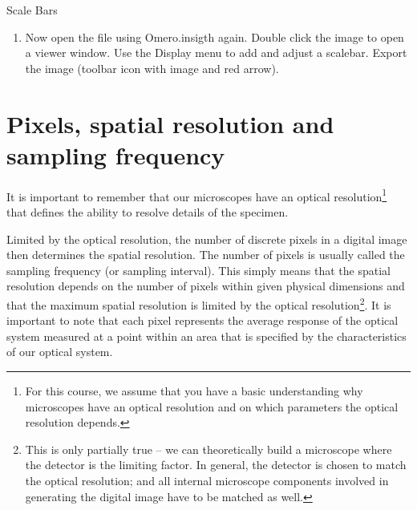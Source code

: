 \begin{taskbox}{Scale Bars}
\begin{enumerate}
        
	\begin{minipage}[t]{\linewidth}
		\begin{center}
		\medskip
		\label{fig:scale-bar-dialog}
		\end{center}
	\end{minipage}
	\item Now open the file using Omero.insigth again. Double
          click the image to open a viewer window. Use the Display
          menu to add and adjust a scalebar. Export the image (toolbar
          icon with image and red arrow).
\end{enumerate}

\end{taskbox}



\section{Pixels, spatial resolution and sampling frequency}
\label{sec:mod1-samplingrate}

It is important to remember that our microscopes have an optical resolution\footnote{For this course, we assume that you have a basic understanding why microscopes have an optical resolution and on which parameters the optical resolution depends.} that defines the ability to resolve details of the specimen. 

Limited by the optical resolution, the number of discrete pixels in a digital image then determines the spatial resolution. The number of pixels is usually called the sampling frequency (or sampling interval). This simply means that the spatial resolution depends on the number of pixels within given physical dimensions and that the maximum spatial resolution is limited by the optical resolution\footnote{This is only partially true -- we can theoretically build a microscope where the detector is the limiting factor. In general, the detector is chosen to match the optical resolution; and all internal microscope components involved in generating the digital image have to be matched as well.}. It is important to note that each pixel represents the average response of the optical system measured at a point within an area that is specified by the characteristics of our optical system. 

